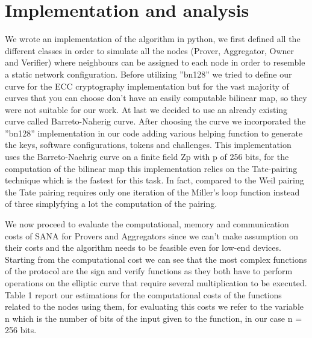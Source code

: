 \documentclass[10pt, a4paper, twocolumn]{article} %
\begin{document}
\section{Implementation and analysis}

We wrote an implementation of the algorithm in python, we first defined all the different classes in order to simulate all the nodes (Prover, Aggregator, Owner and Verifier) where neighbours can be assigned to each node in order to resemble a static network configuration.
Before utilizing ''bn128'' we tried to define our curve for the ECC cryptography implementation but for the vast majority of curves that you can choose don't have an easily computable bilinear map, so they were not suitable for our work. At last we decided to use an already existing curve called Barreto-Naherig curve.
After choosing the curve we incorporated the ''bn128'' implementation in our code adding various helping function to generate the keys, software configurations, tokens and challenges.
This implementation uses the Barreto-Naehrig curve on a finite field Zp with p of 256 bits, for the computation of the bilinear map this implementation relies on the Tate-pairing technique which is the fastest for this task. In fact, compared to the Weil pairing the Tate pairing requires only one iteration of the Miller's loop function instead of three simplyfying a lot the computation of the pairing.

We now proceed to evaluate the computational, memory and communication costs of SANA for Provers and Aggregators since we can't make assumption on their costs and the algorithm needs to be feasible even for low-end devices.
Starting from the computational cost we can see that the most complex functions of the protocol are the sign and verify functions as they both have to perform operations on the elliptic curve that require several multiplication to be executed.
Table 1 report our estimations for the computational costs of the functions related to the nodes using them, for evaluating this costs we refer to the variable n which is the number of bits of the input given to the function, in our case n = 256 bits.
\end{document}

